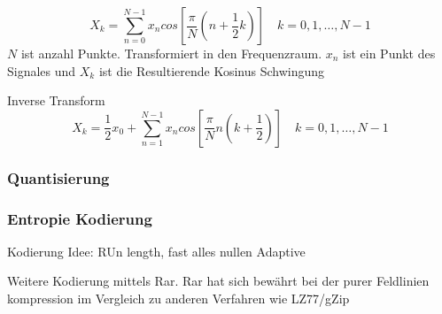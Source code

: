 \begin{equation} \label{konzept:loesung1:kosinus:formula:fdct}
	X_k = \sum_{n=0}^{N-1}x_n cos[\frac{\pi}{N}(n+\frac{1}{2}k)] \quad k = 0, 1, \ldots, N-1
\end{equation}
$N$ ist anzahl Punkte. Transformiert in den Frequenzraum. $x_n$ ist ein Punkt des Signales und $X_k$ ist die Resultierende Kosinus Schwingung%

Inverse Transform
\begin{equation} \label{konzept:loesung1:kosinus:formula:idct}
X_k  = \frac{1}{2}x_0 + \sum_{n=1}^{N-1}x_n cos[\frac{\pi}{N}n(k+\frac{1}{2})] \quad k  = 0,1,\ldots,N-1
\end{equation}

\subsubsection{Quantisierung}


\subsubsection{Entropie Kodierung}\label{konzept:loesung1:kodierung}
Kodierung
	Idee: RUn length, fast alles nullen
	Adaptive

	Weitere Kodierung mittels Rar.
		Rar hat sich bewährt bei der purer Feldlinien kompression im Vergleich zu anderen Verfahren wie LZ77/gZip





